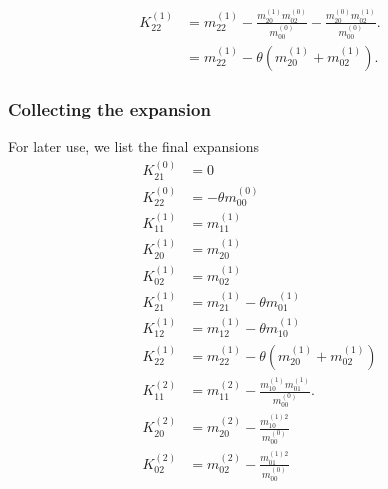 \begin{equation}
  \begin{aligned}
    K_{22}^{(1)}
    & = m_{22}^{(1)}
      - \frac{ m_{20}^{(1)} m_{02}^{(0)} }{m_{00}^{(0)}}
      - \frac{ m_{20}^{(0)} m_{02}^{(1)} }{m_{00}^{(0)}}.
    \\& = m_{22}^{(1)}
      - \theta (m_{20}^{(1)} + m_{02}^{(1)}).
  \end{aligned}
 \end{equation}

\subsubsection{Collecting the expansion}
\label{subs:Collecting the expansion}
For later use, we list the final expansions
\begin{equation}
  \label{eq: expansions of cumulants}
  \begin{aligned}
    K_{21}^{(0)} & = 0\\
    K_{22}^{(0)} & = -\theta m_{00}^{(0)}\\
    K_{11}^{(1)} & = m_{11}^{(1)} \\
    K_{20}^{(1)} & = m_{20}^{(1)} \\
    K_{02}^{(1)} & = m_{02}^{(1)} \\
    K_{21}^{(1)} & = m_{21}^{(1)} - \theta m_{01}^{(1)} \\
    K_{12}^{(1)} & = m_{12}^{(1)} - \theta m_{10}^{(1)} \\
    K_{22}^{(1)} & = m_{22}^{(1)} - \theta (m_{20}^{(1)} + m_{02}^{(1)}) \\
    K_{11}^{(2)} & = m_{11}^{(2)} - \frac{ m_{10}^{(1)}m_{01}^{(1)}}{m_{00}^{(0)}}. \\
    K_{20}^{(2)} & = m_{20}^{(2)} - \frac{ m_{10}^{(1)2}}{m_{00}^{(0)}} \\
    K_{02}^{(2)} & = m_{02}^{(2)} - \frac{ m_{01}^{(1)2}}{m_{00}^{(0)}}
  \end{aligned}
\end{equation}
